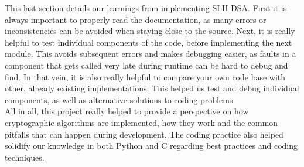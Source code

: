 \documentclass[journal=tosc,notanonymous]{iacrtrans}
\begin{document}
This last section details our learnings from implementing SLH-DSA.
First it is always important to properly read the documentation, as many errors or inconsistencies can be avoided when staying close to the source.
Next, it is really helpful to test individual components of the code, before implementing the next module.
This avoids subsequent errors and makes debugging easier, as faults in a component that gets called very late during runtime can be hard to debug and find.
In that vein, it is also really helpful to compare your own code base with other, already existing implementations.
This helped us test and debug individual components, as well as alternative solutions to coding problems.
\\
All in all, this project really helped to provide a perspective on how cryptographic algorithms are implemented, how they work and the common pitfalls that can happen during development.
The coding practice also helped solidify our knowledge in both Python and C regarding best practices and coding techniques.




\end{document}
